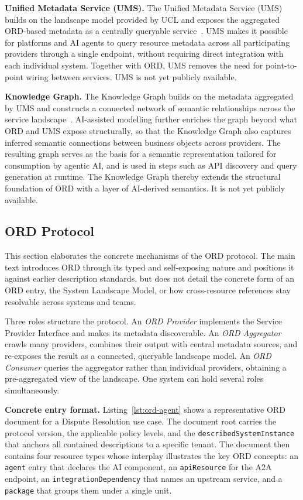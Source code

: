 \textbf{Unified Metadata Service (UMS).} The Unified Metadata Service (UMS) builds on the landscape model provided by UCL and exposes the aggregated ORD-based metadata as a centrally queryable service~\cite{sap_se_apeiro_2026}. UMS makes it possible for platforms and AI agents to query resource metadata across all participating providers through a single endpoint, without requiring direct integration with each individual system. Together with ORD, UMS removes the need for point-to-point wiring between services. UMS is not yet publicly available.

\textbf{Knowledge Graph.} The Knowledge Graph builds on the metadata aggregated by UMS and constructs a connected network of semantic relationships across the service landscape~\cite{sap_se_apeiro_2026}. AI-assisted modelling further enriches the graph beyond what ORD and UMS expose structurally, so that the Knowledge Graph also captures inferred semantic connections between business objects across providers. The resulting graph serves as the basis for a semantic representation tailored for consumption by agentic AI, and is used in steps such as API discovery and query generation at runtime. The Knowledge Graph thereby extends the structural foundation of ORD with a layer of AI-derived semantics. It is not yet publicly available.

\subsection{ORD Protocol}
\label{appendix:ord-protocol}

This section elaborates the concrete mechanisms of the ORD protocol. The main text introduces ORD through its typed and self-exposing nature and positions it against earlier description standards, but does not detail the concrete form of an ORD entry, the System Landscape Model, or how cross-resource references stay resolvable across systems and teams.

Three roles structure the protocol. An \emph{ORD Provider} implements the Service Provider Interface and makes its metadata discoverable. An \emph{ORD Aggregator} crawls many providers, combines their output with central metadata sources, and re-exposes the result as a connected, queryable landscape model. An \emph{ORD Consumer} queries the aggregator rather than individual providers, obtaining a pre-aggregated view of the landscape. One system can hold several roles simultaneously.

\textbf{Concrete entry format.} Listing~\ref{lst:ord-agent} shows a representative ORD document for a Dispute Resolution use case. The document root carries the protocol version, the applicable policy levels, and the \texttt{describedSystemInstance} that anchors all contained descriptions to a specific tenant. The document then contains four resource types whose interplay illustrates the key ORD concepts: an \texttt{agent} entry that declares the AI component, an \texttt{apiResource} for the A2A endpoint, an \texttt{integrationDependency} that names an upstream service, and a \texttt{package} that groups them under a single unit.

